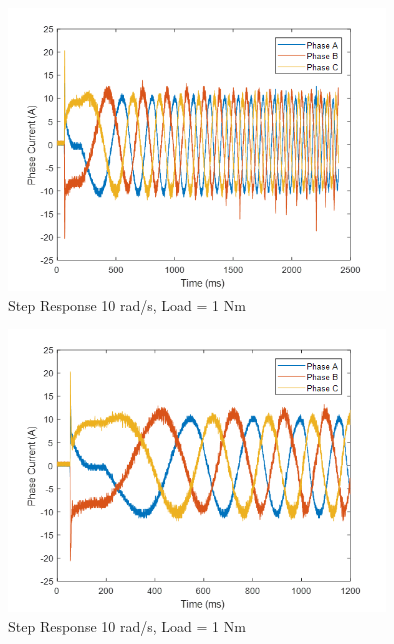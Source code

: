 \begin{figure}[h!p]
\centering
\includegraphics[width=10cm]{Images/waveforms/sin19.png} 
\caption[sin19]{Step Response 10 rad/s, Load = 1 Nm}
\label{fig:sin19}
\end{figure}

\begin{figure}[h!p]
\centering
\includegraphics[width=10cm]{Images/waveforms/sin20.png} 
\caption[sin20]{Step Response 10 rad/s, Load = 1 Nm}
\label{fig:sin20}
\end{figure}